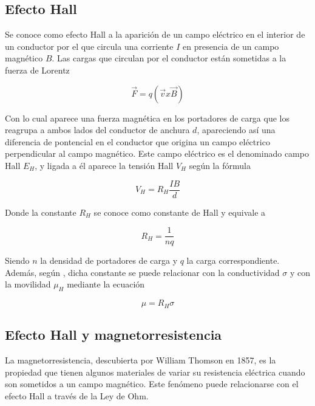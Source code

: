 \subsection{Efecto Hall}

Se conoce como efecto Hall a la aparición de un campo eléctrico en el interior de un conductor por el que circula una corriente $I$ en presencia de un campo magnético $B$. Las cargas que circulan por el conductor están sometidas a la fuerza de Lorentz

\begin{equation}
	\overrightarrow{F} = q(\overrightarrow{v}x\overrightarrow{B})
\end{equation}

Con lo cual aparece una fuerza magnética en los portadores de carga que los reagrupa a ambos lados del conductor de anchura $d$, apareciendo así una diferencia de pontencial en el conductor que origina un campo eléctrico perpendicular al campo magnético. Este campo eléctrico es el denominado campo Hall $E_H$, y ligada a él aparece la tensión Hall $V_H$ según la fórmula

\begin{equation}
	V_H = R_H\frac{IB}{d}
\end{equation}

Donde la constante $R_H$ se conoce como constante de Hall y equivale a

\begin{equation}
	R_H = \frac{1}{nq}
\end{equation}

Siendo $n$ la densidad de portadores de carga y $q$ la carga correspondiente. Además, según \cite{movilidad}, dicha constante se puede relacionar con la conductividad $\sigma$ y con la movilidad $\mu_H$ mediante la ecuación

\begin{equation}
	\mu = R_H \sigma
\end{equation}

\subsection{Efecto Hall y magnetorresistencia}

La magnetorresistencia, descubierta por William Thomson en 1857, es la propiedad que tienen algunos materiales de variar su resistencia eléctrica cuando son sometidos a un campo magnético. Este fenómeno puede relacionarse con el efecto Hall a través de la Ley de Ohm.

